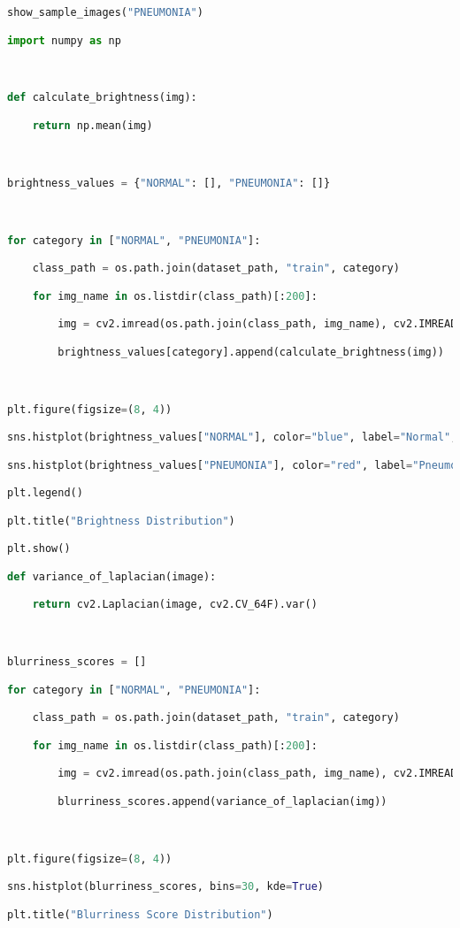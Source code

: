 \documentclass{article}
\begin{document}
\begin{lstlisting}[style=mystyle,language=Python]
show_sample_images("PNEUMONIA")

import numpy as np



def calculate_brightness(img):

    return np.mean(img)



brightness_values = {"NORMAL": [], "PNEUMONIA": []}



for category in ["NORMAL", "PNEUMONIA"]:

    class_path = os.path.join(dataset_path, "train", category)

    for img_name in os.listdir(class_path)[:200]:

        img = cv2.imread(os.path.join(class_path, img_name), cv2.IMREAD_GRAYSCALE)

        brightness_values[category].append(calculate_brightness(img))



plt.figure(figsize=(8, 4))

sns.histplot(brightness_values["NORMAL"], color="blue", label="Normal", kde=True)

sns.histplot(brightness_values["PNEUMONIA"], color="red", label="Pneumonia", kde=True)

plt.legend()

plt.title("Brightness Distribution")

plt.show()

def variance_of_laplacian(image):

    return cv2.Laplacian(image, cv2.CV_64F).var()



blurriness_scores = []

for category in ["NORMAL", "PNEUMONIA"]:

    class_path = os.path.join(dataset_path, "train", category)

    for img_name in os.listdir(class_path)[:200]:

        img = cv2.imread(os.path.join(class_path, img_name), cv2.IMREAD_GRAYSCALE)

        blurriness_scores.append(variance_of_laplacian(img))



plt.figure(figsize=(8, 4))

sns.histplot(blurriness_scores, bins=30, kde=True)

plt.title("Blurriness Score Distribution")


\end{lstlisting}
\end{document}
